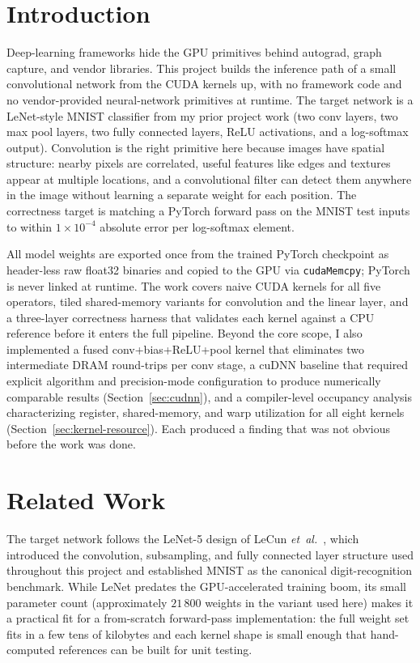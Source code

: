 \documentclass[conference]{IEEEtran}
\begin{document}
\section{Introduction}
Deep-learning frameworks hide the GPU primitives behind autograd,
graph capture, and vendor libraries. This project builds the
inference path of a small convolutional network from the CUDA kernels
up, with no framework code and no vendor-provided neural-network
primitives at runtime. The target network is a LeNet-style MNIST
classifier from my prior project work (two conv layers, two
max pool layers, two fully connected layers, ReLU activations, and a
log-softmax output). Convolution is the right primitive here because
images have spatial structure: nearby pixels are correlated, useful
features like edges and textures appear at multiple locations, and a
convolutional filter can detect them anywhere in the image without
learning a separate weight for each position. The correctness target is matching a PyTorch forward pass on the
MNIST test inputs to within $1\times10^{-4}$ absolute error per
log-softmax element.

All model weights are exported once from the trained PyTorch
checkpoint as header-less raw float32 binaries and copied to the GPU
via \texttt{cudaMemcpy}; PyTorch is never linked at runtime. The
work covers naive CUDA kernels for all five operators, tiled
shared-memory variants for convolution and the linear layer, and a
three-layer correctness harness that validates each kernel against a
CPU reference before it enters the full pipeline. Beyond the core scope, I also implemented a fused conv+bias+ReLU+pool
kernel that eliminates two intermediate DRAM round-trips per conv stage,
a cuDNN baseline that required explicit algorithm and precision-mode
configuration to produce numerically comparable results
(Section~\ref{sec:cudnn}), and a compiler-level occupancy analysis
characterizing register, shared-memory, and warp utilization for all
eight kernels (Section~\ref{sec:kernel-resource}). Each produced a
finding that was not obvious before the work was done.

\section{Related Work}
The target network follows the LeNet-5 design of LeCun
\emph{et~al.}~\cite{lecun1998}, which introduced the convolution,
subsampling, and fully connected layer structure used throughout this
project and established MNIST as the canonical digit-recognition
benchmark. While LeNet predates the GPU-accelerated training boom,
its small parameter count (approximately $21\,800$ weights in the
variant used here) makes it a practical fit for a
from-scratch forward-pass implementation: the full weight set fits in
a few tens of kilobytes and each kernel shape is small enough that
hand-computed references can be built for unit testing.
\end{document}

